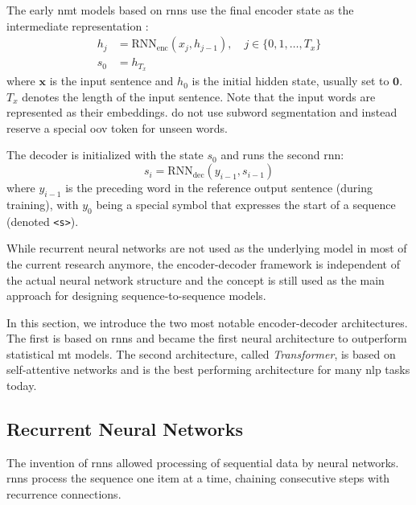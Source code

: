 The early \ac{nmt} models based on \acp{rnn} use the final encoder state as the
intermediate representation \citep{sutskever2014sequence}:
%
\begin{align}
  h_j &= \mathrm{RNN}_{\text{enc}}(x_j, h_{j-1}), \quad j \in
          \{0, 1, \ldots, T_x \} \\
  s_0 &= h_{T_x}
\end{align}
%
where $\mathbf{x}$ is the input sentence and $h_0$ is the initial hidden state,
usually set to $\mathbf{0}$. $T_x$ denotes the length of the input sentence.
Note that the input words are represented as their embeddings.
\citet{sutskever2014sequence} do not use subword segmentation and instead
reserve a special \ac{oov} token for unseen words.

The decoder is initialized with the state $s_0$ and runs the second \ac{rnn}:
\begin{equation} s_i = \mathrm{RNN}_{\text{dec}}(y_{i-1}, s_{i-1})
\end{equation}
%
where $y_{i-1}$ is the preceding word in the reference output sentence (during
training), with $y_0$ being a special symbol that expresses the start of a
sequence (denoted \texttt{<s>}).

While recurrent neural networks are not used as the underlying model in most of
the current research anymore, the encoder-decoder framework is independent of
the actual neural network structure and the concept is still used as the main
approach for designing sequence-to-sequence models.

In this section, we introduce the two most notable encoder-decoder
architectures. The first is based on \acp{rnn} and became the first neural
architecture to outperform statistical \ac{mt} models. The second architecture,
called \emph{Transformer}, is based on self-attentive networks and is the best
performing architecture for many \ac{nlp} tasks today.


\subsection{Recurrent Neural Networks}
\label{sec:encdec:rnn}

The invention of \acp{rnn} \citep{elman1990finding} allowed processing of
sequential data by neural networks. \Acp{rnn} process the sequence one item at
a time, chaining consecutive steps with recurrence connections.


